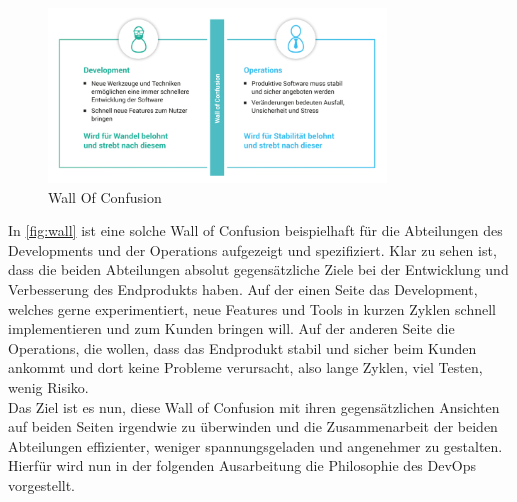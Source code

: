 \begin{figure}[h]
\centering
\includegraphics[width=0.8\textwidth]{Graphics/wall_of_confusion}
\caption{Wall Of Confusion \cite{novatec:2021}}
\label{fig:wall}
\end{figure}

In \autoref{fig:wall} ist eine solche Wall of Confusion beispielhaft für die Abteilungen des Developments und der Operations aufgezeigt und spezifiziert. Klar zu sehen ist, dass die beiden Abteilungen absolut gegensätzliche Ziele bei der Entwicklung und Verbesserung des Endprodukts haben. Auf der einen Seite das Development, welches gerne experimentiert, neue Features und Tools in kurzen Zyklen schnell implementieren und zum Kunden bringen will. Auf der anderen Seite die Operations, die wollen, dass das Endprodukt stabil und sicher beim Kunden ankommt und dort keine Probleme verursacht, also lange Zyklen, viel Testen, wenig Risiko.\\
Das Ziel ist es nun, diese Wall of Confusion mit ihren gegensätzlichen Ansichten auf beiden Seiten irgendwie zu überwinden und die Zusammenarbeit der beiden Abteilungen effizienter, weniger spannungsgeladen und angenehmer zu gestalten. Hierfür wird nun in der folgenden Ausarbeitung die Philosophie des \ac{DevOps} vorgestellt. 
